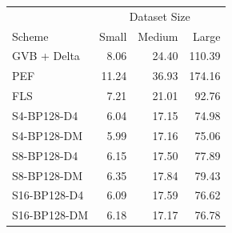 \begin{tabular}{lrrr}
\toprule
 & \multicolumn{3}{c}{Dataset Size} \\
Scheme & Small & Medium & Large \\
\midrule
GVB + Delta & 8.06 & 24.40 & 110.39 \\
PEF & 11.24 & 36.93 & 174.16 \\
FLS & 7.21 & 21.01 & 92.76 \\
S4-BP128-D4 & 6.04 & 17.15 & 74.98 \\
S4-BP128-DM & 5.99 & 17.16 & 75.06 \\
S8-BP128-D4 & 6.15 & 17.50 & 77.89 \\
S8-BP128-DM & 6.35 & 17.84 & 79.43 \\
S16-BP128-D4 & 6.09 & 17.59 & 76.62 \\
S16-BP128-DM & 6.18 & 17.17 & 76.78 \\
\bottomrule
\end{tabular}
